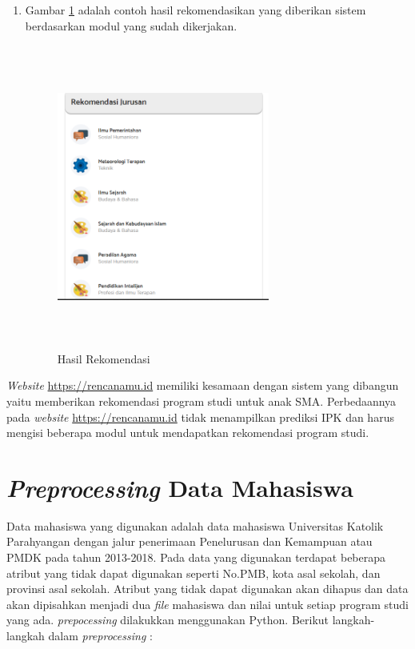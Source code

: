 \begin{enumerate}
    \item Gambar \ref{gambar36} adalah contoh hasil rekomendasikan yang diberikan sistem berdasarkan modul yang sudah dikerjakan.
    
    \begin{figure}[H]
        \centering
        \includegraphics[width = 7cm, height = 10cm ]{Gambar/gambar36.PNG}
        \caption{Hasil Rekomendasi}
        \label{gambar36}
    \end{figure}
    
\end{enumerate}

\textit{Website} \url{https://rencanamu.id} memiliki kesamaan dengan sistem yang dibangun yaitu memberikan rekomendasi program studi untuk anak SMA. Perbedaannya pada \textit{website} \url{https://rencanamu.id} tidak menampilkan prediksi IPK dan harus mengisi beberapa modul untuk mendapatkan rekomendasi program studi. 

\section{\textit{Preprocessing} Data Mahasiswa}
\label{sec:preprocessing}
Data mahasiswa yang digunakan adalah data mahasiswa Universitas Katolik Parahyangan dengan jalur penerimaan Penelurusan dan Kemampuan atau PMDK pada tahun 2013-2018. Pada data yang digunakan terdapat beberapa atribut yang tidak dapat digunakan seperti No.PMB,  kota asal sekolah, dan provinsi asal sekolah. Atribut yang tidak dapat digunakan akan dihapus dan data akan dipisahkan menjadi dua \textit{file} mahasiswa dan nilai untuk setiap program studi yang ada. \textit{prepocessing} dilakukkan menggunakan Python. Berikut langkah-langkah dalam \textit{preprocessing} :

